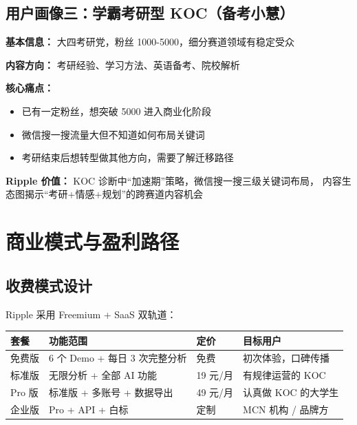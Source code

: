 \documentclass[12pt,a4paper]{ctexart}
\begin{document}
\subsection{用户画像三：学霸考研型 KOC（备考小慧）}

\begin{tcolorbox}[colback=lightbg,colframe=success!40,arc=5pt,
  left=8pt,right=8pt,top=6pt,bottom=6pt]
\textbf{基本信息：} 大四考研党，粉丝 1000-5000，细分赛道领域有稳定受众

\textbf{内容方向：} 考研经验、学习方法、英语备考、院校解析

\textbf{核心痛点：}
\begin{itemize}
  \item 已有一定粉丝，想突破 5000 进入商业化阶段
  \item 微信搜一搜流量大但不知道如何布局关键词
  \item 考研结束后想转型做其他方向，需要了解迁移路径
\end{itemize}

\textbf{Ripple 价值：} KOC 诊断中``加速期''策略，微信搜一搜三级关键词布局，
内容生态图揭示``考研+情感+规划''的跨赛道内容机会
\end{tcolorbox}


\section{商业模式与盈利路径}

\subsection{收费模式设计}

Ripple 采用 Freemium + SaaS 双轨道：

\begin{center}
\begin{tabular}{p{2cm} p{4cm} p{3.5cm} p{4cm}}
\toprule
\textbf{套餐} & \textbf{功能范围} & \textbf{定价} & \textbf{目标用户} \\
\midrule
免费版 & 6 个 Demo + 每日 3 次完整分析 & 免费 & 初次体验，口碑传播 \\[3pt]
标准版 & 无限分析 + 全部 AI 功能 & 19 元/月 & 有规律运营的 KOC \\[3pt]
Pro 版 & 标准版 + 多账号 + 数据导出 & 49 元/月 & 认真做 KOC 的大学生 \\[3pt]
企业版 & Pro + API + 白标 & 定制 & MCN 机构 / 品牌方 \\
\bottomrule
\end{tabular}
\end{center}
\end{document}
